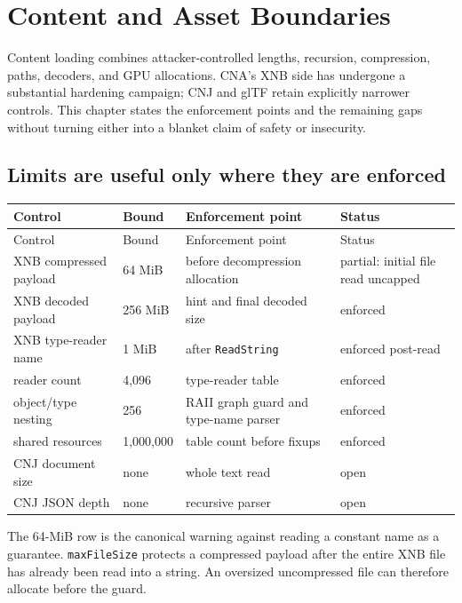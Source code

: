 \chapter{Content and Asset Boundaries}
\label{ch:content-robustness}

Content loading combines attacker-controlled lengths, recursion, compression, paths, decoders,
and GPU allocations.  CNA's XNB side has undergone a substantial hardening campaign; CNJ and
glTF retain explicitly narrower controls.  This chapter states the enforcement points and the
remaining gaps without turning either into a blanket claim of safety or insecurity.

\section{Limits are useful only where they are enforced}

\begin{longtable}{p{}p{}p{}p{}}
\toprule
Control & Bound & Enforcement point & Status \\
\midrule
\endfirsthead
\toprule
Control & Bound & Enforcement point & Status \\
\midrule
\endhead
XNB compressed payload & 64 MiB & before decompression allocation & partial: initial file read uncapped \\
XNB decoded payload & 256 MiB & hint and final decoded size & enforced \\
XNB type-reader name & 1 MiB & after \texttt{ReadString} & enforced post-read \\
reader count & 4,096 & type-reader table & enforced \\
object/type nesting & 256 & RAII graph guard and type-name parser & enforced \\
shared resources & 1,000,000 & table count before fixups & enforced \\
CNJ document size & none & whole text read & open \\
CNJ JSON depth & none & recursive parser & open \\
\bottomrule
\end{longtable}

The 64-MiB row is the canonical warning against reading a constant name as a guarantee.
\texttt{maxFileSize} protects a compressed payload after the entire XNB file has already been
read into a string.  An oversized uncompressed file can therefore allocate before the guard.

